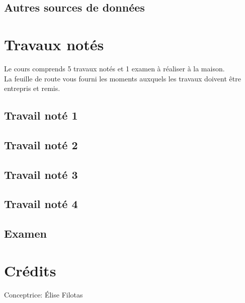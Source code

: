 \documentclass[
  12pt,
]{krantz}
\begin{document}
\hypertarget{autres-sources-de-donnuxe9es}{%
\section*{Autres sources de données}\label{autres-sources-de-donnuxe9es}}


\hypertarget{travaux-notuxe9s-1}{%
\chapter*{Travaux notés}\label{travaux-notuxe9s-1}}


Le cours comprends 5 travaux notés et 1 examen à réaliser à la maison.\\
La feuille de route vous fourni les moments auxquels les travaux doivent être entrepris et remis.

\hypertarget{travail-notuxe9-1}{%
\section*{Travail noté 1}\label{travail-notuxe9-1}}


\hypertarget{travail-notuxe9-2}{%
\section*{Travail noté 2}\label{travail-notuxe9-2}}


\hypertarget{travail-notuxe9-3}{%
\section*{Travail noté 3}\label{travail-notuxe9-3}}


\hypertarget{travail-notuxe9-4}{%
\section*{Travail noté 4}\label{travail-notuxe9-4}}


\hypertarget{examen}{%
\section*{Examen}\label{examen}}


\hypertarget{cruxe9dits}{%
\chapter*{Crédits}\label{cruxe9dits}}


Conceptrice: Élise Filotas
\end{document}
